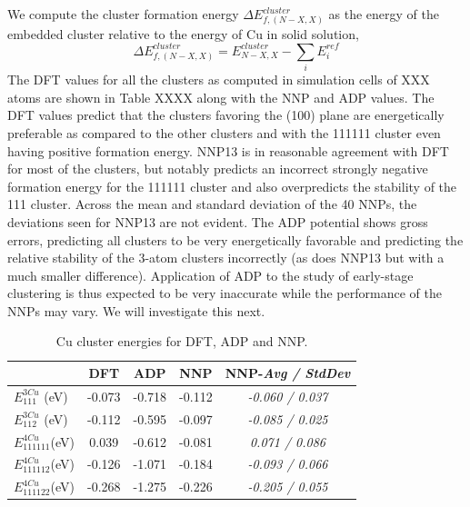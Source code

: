\documentclass{article}
\begin{document}
We compute the cluster formation energy $\Delta E^{cluster}_{f,(N-X,X)}$ as the energy of the embedded cluster relative to the energy of Cu in solid solution,
\begin{equation}
\Delta E^{cluster}_{f,(N-X,X)} = E^{cluster}_{N-X,X} - \sum_i E^{ref}_i
\end{equation}
The DFT values for all the clusters as computed in simulation cells of XXX atoms are shown in Table XXXX along with the NNP and ADP values.  The DFT values predict that the clusters favoring the (100) plane are energetically preferable as compared to the other clusters and with the 111111 cluster even having positive formation energy.  NNP13 is in reasonable agreement with DFT for most of the clusters, but notably predicts an incorrect strongly negative formation energy for the 111111 cluster and also overpredicts the stability of the 111 cluster.  Across the mean and standard deviation of the 40 NNPs, the deviations seen for NNP13 are not evident.  The ADP potential shows gross errors, predicting all clusters to be very energetically favorable and predicting the relative stability of the 3-atom clusters incorrectly (as does NNP13 but with a much smaller difference).  Application of ADP to the study of early-stage clustering is thus expected to be very inaccurate while the performance of the NNPs may vary.  We will investigate this next.


\begin{table}[H]
\begin{tabular}{l|cccc}%
\hline%
&DFT&ADP&NNP& NNP-\emph{Avg / StdDev}\\%
\hline%
$E^{3Cu}_{111}$ (eV)&-0.073&{-}0.718&{-}0.112&\emph{-0.060 / 0.037}\\%
$E^{3Cu}_{112}$ (eV)&-0.112&{-}0.595&{-}0.097&\emph{-0.085 / 0.025}\\%
$E^{4Cu}_{111111}$(eV)&0.039&{-}0.612&{-}0.081&\emph{0.071 / 0.086}\\%
$E^{4Cu}_{111112}$(eV)&-0.126&{-}1.071&{-}0.184&\emph{-0.093 / 0.066}\\%
$E^{4Cu}_{111122}$(eV)&-0.268&{-}1.275&{-}0.226&\emph{-0.205 / 0.055}\\%
\hline%
\end{tabular}%
\caption{Cu cluster energies for DFT, ADP and NNP.}
\label{table:solute_cluster}
\end{table}
\end{document}
